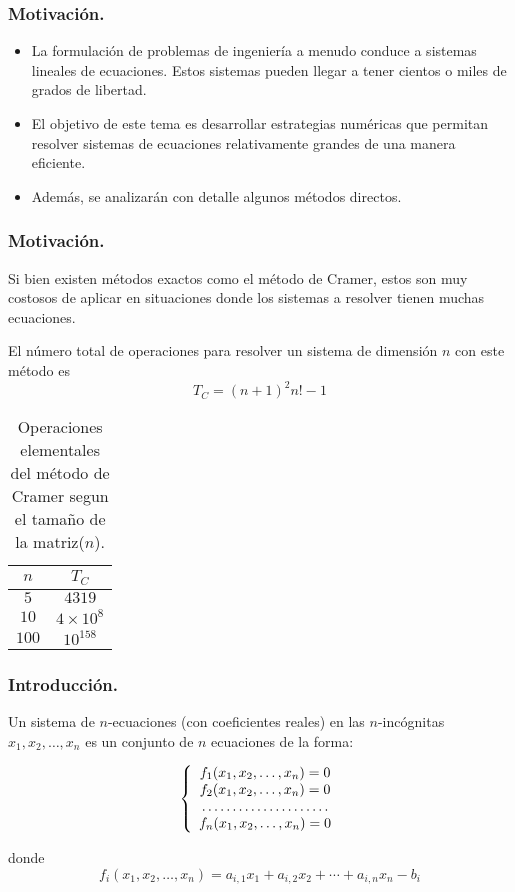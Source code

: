 \documentclass{beamer}
\begin{document}
\frame
{
  \frametitle{Motivaci\'on.} 
  \begin{itemize}
   \item<1->La formulaci\'on de problemas de ingenier\'ia a menudo conduce a sistemas lineales de ecuaciones. Estos sistemas pueden llegar a tener cientos o miles de grados de libertad. 
   \item<2-> El objetivo de este tema es desarrollar estrategias num\'ericas que permitan resolver sistemas de ecuaciones relativamente grandes de una manera eficiente. 
   \item<3-> Adem\'as, se analizar\'an con detalle algunos m\'etodos directos.
  \end{itemize}
}
\frame
{
   \frametitle{Motivaci\'on.}
   
Si bien existen m\'etodos exactos  como el m\'etodo de Cramer, estos son muy costosos de aplicar en situaciones donde los sistemas a resolver tienen muchas ecuaciones.

El n\'umero total de operaciones para resolver un sistema de dimensi\'on $n$ con este m\'etodo es
$$
T_C = (n+1)^{2}n!-1
$$

\begin{table}[!ht]
 \begin{tabular}{|c|c|}\hline
$n$ & $T_C$  \\\hline
$5$ & $4319$ \\\hline
$10$ & $4\times10^8$\\\hline
$100$ &  $10^{158}$\\\hline
 \end{tabular}
\caption{Operaciones elementales del m\'etodo de Cramer segun el tama\~no de la matriz($n$).}
\end{table}
}
\frame
{
\frametitle{Introducci\'on.}
Un sistema de $n$-ecuaciones (con coeficientes reales) en las $n$-inc\'ognitas $x_1,
x_2,\ldots,x_n$ es un conjunto de $n$ ecuaciones de la forma:

$$
\left\{
\begin{array}{c}
  f_1(x_1,x_2,\ldots,x_n)=0 \\
  f_2(x_1,x_2,\ldots,x_n)=0 \\
  \dotfill \\
  f_n(x_1,x_2,\ldots,x_n)=0 \\
\end{array}
\right.
$$

donde
$$f_i(x_1,x_2,\ldots,x_n) = a_{i,1}x_1 + a_{i,2}x_2 + \cdots + a_{i,n}x_n - b_i$$
}
\end{document}
